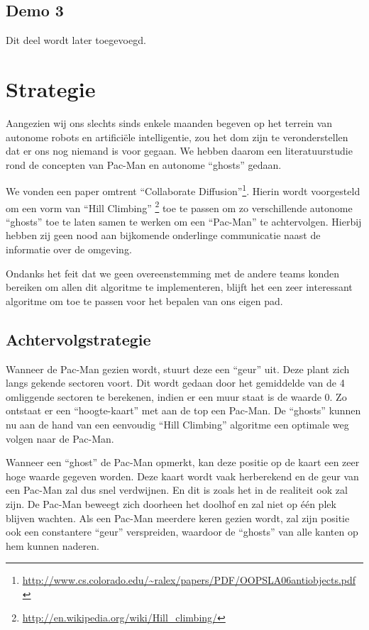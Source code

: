 \documentclass[12pt,a4paper]{report}
\begin{document}
\section{Demo 3}

Dit deel wordt later toegevoegd.

\chapter{Strategie}

Aangezien wij ons slechts sinds enkele maanden begeven op het terrein van autonome robots en artifici\"ele intelligentie, zou het dom zijn te veronderstellen dat er ons nog niemand is voor gegaan. We hebben daarom een literatuurstudie rond de concepten van Pac-Man en autonome ``ghosts'' gedaan.

We vonden een paper omtrent ``Collaborate Diffusion''\footnote{\url{http://www.cs.colorado.edu/~ralex/papers/PDF/OOPSLA06antiobjects.pdf}}. Hierin wordt voorgesteld om een vorm van ``Hill Climbing'' \footnote{\url{http://en.wikipedia.org/wiki/Hill_climbing/}} toe te passen om zo verschillende autonome ``ghosts'' toe te laten samen te werken om een ``Pac-Man'' te achtervolgen. Hierbij hebben zij geen nood aan bijkomende onderlinge communicatie naast de informatie over de omgeving.

Ondanks het feit dat we geen overeenstemming met de andere teams konden bereiken om allen dit algoritme te implementeren, blijft het een zeer interessant algoritme om toe te passen voor het bepalen van ons eigen pad.

\section{Achtervolgstrategie}

Wanneer de Pac-Man gezien wordt, stuurt deze een ``geur'' uit. Deze plant zich langs gekende sectoren voort. Dit wordt gedaan door het gemiddelde van de 4 omliggende sectoren te berekenen, indien er een muur staat is de waarde 0. Zo ontstaat er een ``hoogte-kaart'' met aan de top een Pac-Man. De ``ghosts'' kunnen nu aan de hand van een eenvoudig ``Hill Climbing'' algoritme een optimale weg volgen naar de Pac-Man.

Wanneer een ``ghost'' de Pac-Man opmerkt, kan deze positie op de kaart een zeer hoge waarde gegeven worden. Deze kaart wordt vaak herberekend en de geur van een Pac-Man zal dus snel verdwijnen. En dit is zoals het in de realiteit ook zal zijn. De Pac-Man beweegt zich doorheen het doolhof en zal niet op \'e\'en plek blijven wachten. Als een Pac-Man meerdere keren gezien wordt, zal zijn positie ook een constantere ``geur'' verspreiden, waardoor de ``ghosts'' van alle kanten op hem kunnen naderen. 
\end{document}
